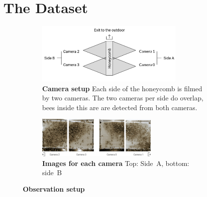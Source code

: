 \section{The Dataset}
\label{sec:dataset}

\begin{figure}
    \centering
    \begin{subfigure}[b]{\textwidth}
	\centering
	\includegraphics[width=0.8\textwidth]{Figures/setupCams}
	\caption[Camera setup]{\textbf{Camera setup} Each side of the honeycomb is filmed by two cameras. The two cameras per side do overlap, bees inside this are are detected from both cameras.}
	\label{fig:cams}
	\vspace{5mm}
    \end{subfigure}
    \begin{subfigure}[b]{\textwidth}
	\centering
	\includegraphics[width=0.65\textwidth]{Figures/beesClose}
	\vspace{5mm}
	\caption[Images for each camera]{\textbf{Images for each camera} Top: Side~A, bottom: side~B}
	\label{fig:veryclose}
    \end{subfigure}
 	\caption[Observation setup]{\textbf{Observation setup}}
 	\label{fig:obssetup}
\end{figure}

